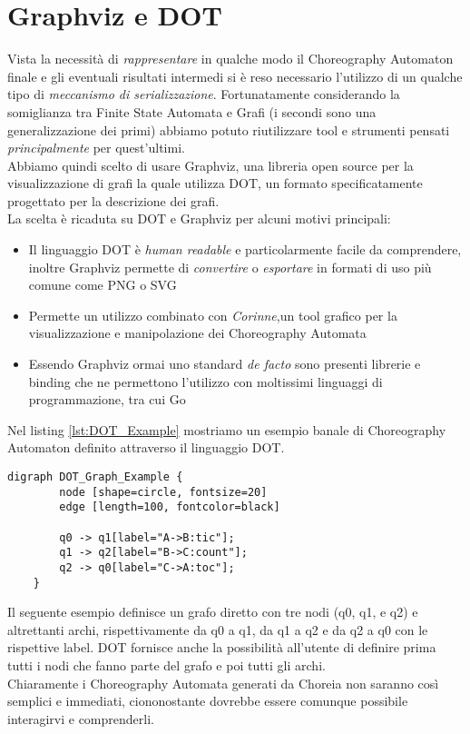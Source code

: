 \section{Graphviz e DOT}
Vista la necessità di \emph{rappresentare} in qualche modo il Choreography Automaton finale e gli eventuali risultati intermedi si è reso necessario l'utilizzo di un qualche tipo di \emph{meccanismo di serializzazione}. Fortunatamente considerando la somiglianza tra Finite State Automata e Grafi (i secondi sono una generalizzazione dei primi) abbiamo potuto riutilizzare tool e strumenti pensati \emph{principalmente} per quest'ultimi.\\
Abbiamo quindi scelto di usare Graphviz\cite{Graphviz}, una libreria open source per la visualizzazione di grafi la quale utilizza DOT\cite{DOT_Lang}, un formato specificatamente progettato per la descrizione dei grafi.\\
La scelta è ricaduta su DOT e Graphviz per alcuni motivi principali:
\begin{itemize}
    \item Il linguaggio DOT è \emph{human readable} e particolarmente facile da comprendere, inoltre Graphviz permette di \emph{convertire} o \emph{esportare} in formati di uso più comune come PNG o SVG
    \item Permette un utilizzo combinato con \emph{Corinne}\cite{Corinne},un tool grafico per la visualizzazione e manipolazione dei Choreography Automata
    \item Essendo Graphviz ormai uno standard \emph{de facto} sono presenti librerie e binding che ne permettono l'utilizzo con moltissimi linguaggi di programmazione, tra cui Go
\end{itemize}
Nel listing \ref{lst:DOT_Example} mostriamo un esempio banale di Choreography Automaton definito attraverso il linguaggio DOT.
\begin{lstlisting}[label=lst:DOT_Example, caption=Rappresentazione in DOT dell'automa in figura \ref{fig:ChoreographyAutomata_Example}]
    digraph DOT_Graph_Example {
        node [shape=circle, fontsize=20]
        edge [length=100, fontcolor=black]
      
        q0 -> q1[label="A->B:tic"];
        q1 -> q2[label="B->C:count"];
        q2 -> q0[label="C->A:toc"];
    }
\end{lstlisting}
Il seguente esempio definisce un grafo diretto con tre nodi (q0, q1, e q2) e altrettanti archi, rispettivamente da q0 a q1, da q1 a q2 e da q2 a q0 con le rispettive label. DOT fornisce anche la possibilità all'utente di definire prima tutti i nodi che fanno parte del grafo e poi tutti gli archi.\\
Chiaramente i Choreography Automata generati da Choreia non saranno così semplici e immediati, ciononostante dovrebbe essere comunque possibile interagirvi e comprenderli.